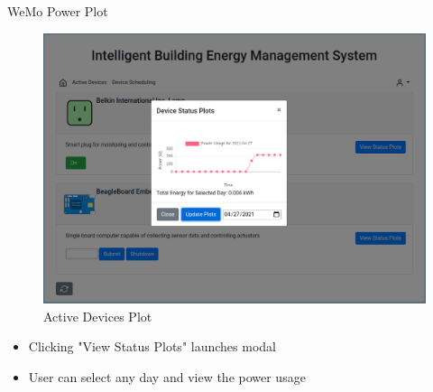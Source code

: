 \documentclass{beamer}
\begin{document}
\begin{frame}{WeMo Power Plot}{} %
    \begin{figure}
        \centering
        \includegraphics[scale=0.15]{figs/webServer/ActiveDevices_plot.png}
        \caption{Active Devices Plot}
        \label{fig:active_devices_plot}
    \end{figure}
    \begin{block}{}
      \begin{small}
        \begin{itemize}
            \item Clicking "View Status Plots" launches modal
            \item User can select any day and view the power usage
        \end{itemize}
      \end{small}
    \end{block}
\end{frame}
\end{document}
